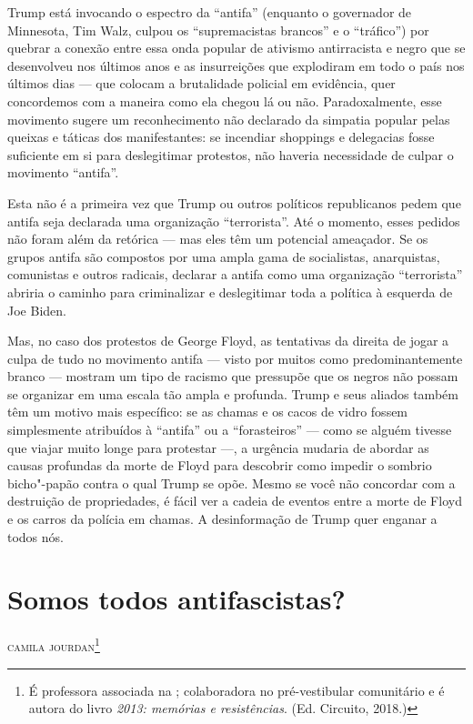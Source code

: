 Trump está invocando o espectro da ``antifa'' (enquanto o governador de Minnesota, Tim Walz, culpou os ``supremacistas brancos'' e o ``tráfico'') por quebrar a conexão entre essa onda popular de ativismo antirracista e negro que se desenvolveu nos últimos anos e as insurreições que explodiram em todo o país nos últimos dias — que colocam a brutalidade policial em evidência, quer concordemos com a maneira como ela chegou lá ou não. Paradoxalmente, esse movimento sugere um reconhecimento não declarado da simpatia popular pelas queixas e táticas dos manifestantes: se incendiar shoppings e delegacias fosse suficiente em si para deslegitimar protestos, não haveria necessidade de culpar o movimento ``antifa''.
 
Esta não é a primeira vez que Trump ou outros políticos republicanos pedem que antifa seja declarada uma organização ``terrorista''. Até o momento, esses pedidos não foram além da retórica — mas eles têm um potencial ameaçador. Se os grupos antifa são compostos por uma ampla gama de socialistas, anarquistas, comunistas e outros radicais, declarar a antifa como uma organização ``terrorista'' abriria o caminho para criminalizar e deslegitimar toda a política à esquerda de Joe Biden.
 
Mas, no caso dos protestos de George Floyd, as tentativas da direita de jogar a culpa de tudo no movimento antifa — visto por muitos como predominantemente branco — mostram um tipo de racismo que pressupõe que os negros não possam se organizar em uma escala tão ampla e profunda. Trump e seus aliados também têm um motivo mais específico: se as chamas e os cacos de vidro fossem simplesmente atribuídos à ``antifa'' ou a ``forasteiros'' — como se alguém tivesse que viajar muito longe para protestar —, a urgência mudaria de abordar as causas profundas da morte de Floyd para descobrir como impedir o sombrio bicho"-papão contra o qual Trump se opõe. Mesmo se você não concordar com a destruição de propriedades, é fácil ver a cadeia de eventos entre a morte de Floyd e os carros da polícia em chamas. A desinformação de Trump quer enganar a todos nós.



\chapter[Somos todos antifascistas?]{Somos todos antifascistas? }

\hfill{}\textsc{camila jourdan}\footnote{É professora associada na ; colaboradora no pré-vestibular
  comunitário  e é autora do livro \emph{2013: memórias e resistências}. (Ed.
  Circuito, 2018.)}

